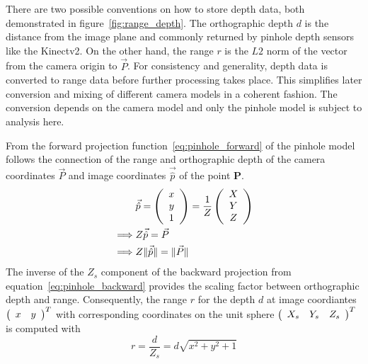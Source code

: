 There are two possible conventions on how to store depth data, both demonstrated in figure~\ref{fig:range_depth}.
The orthographic depth $d$ is the distance from the image plane and commonly returned by pinhole depth sensors like the Kinectv2.
On the other hand, the range $r$ is the $L2$ norm of the vector from the camera origin to $\vec{P}$.
For consistency and generality, depth data is converted to range data before further processing takes place.
This simplifies later conversion and mixing of different camera models in a coherent fashion.
The conversion depends on the camera model and only the pinhole model is subject to analysis here.

From the forward projection function~\ref{eq:pinhole_forward} of the pinhole model follows the connection of the range and orthographic depth of the camera coordinates $\vec{P}$ and image coordinates $\vec{\hat{p}}$ of the point $\mathbf{P}$.
\begin{equation}
\begin{aligned}
    &\vec{\hat{p}} = \left(\begin{array}{c} x \\ y \\ 1 \end{array}\right) = \frac{1}{Z}\left(\begin{array}{c} X \\ Y \\ Z \end{array}\right) \\
    \implies &Z \vec{\hat{p}} = \vec{P} \\
    \implies &Z \lVert\vec{\hat{p}}\rVert = \lVert\vec{P}\rVert
\end{aligned}
\end{equation}
The inverse of the $Z_{s}$ component of the backward projection from equation~\ref{eq:pinhole_backward} provides the scaling factor between orthographic depth and range.
Consequently, the range $r$ for the depth $d$ at image coordiantes $\left(\begin{array}{cc} x & y \end{array}\right)^T$ with corresponding coordinates on the unit sphere $\left(\begin{array}{ccc} X_s & Y_s & Z_s \end{array}\right)^T$ is computed with
\begin{equation}
    r = \frac{d}{Z_s} = d \sqrt{x^2 + y^2 + 1}
\end{equation}
